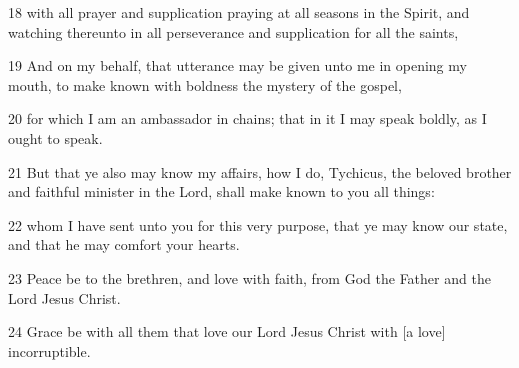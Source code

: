 \par 18 with all prayer and supplication praying at all seasons in the Spirit, and watching thereunto in all perseverance and supplication for all the saints,
\par 19 And on my behalf, that utterance may be given unto me in opening my mouth, to make known with boldness the mystery of the gospel,
\par 20 for which I am an ambassador in chains; that in it I may speak boldly, as I ought to speak.
\par 21 But that ye also may know my affairs, how I do, Tychicus, the beloved brother and faithful minister in the Lord, shall make known to you all things:
\par 22 whom I have sent unto you for this very purpose, that ye may know our state, and that he may comfort your hearts.
\par 23 Peace be to the brethren, and love with faith, from God the Father and the Lord Jesus Christ.
\par 24 Grace be with all them that love our Lord Jesus Christ with [a love] incorruptible.

